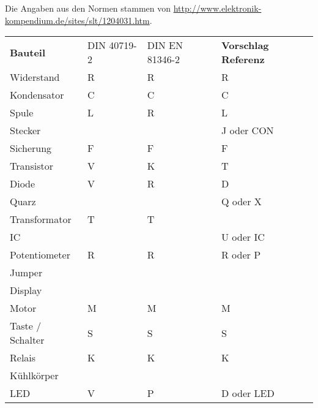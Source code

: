 Die Angaben aus den Normen stammen von 
\url{http://www.elektronik-kompendium.de/sites/slt/1204031.htm}. 
\begin{table}[h!]
  \begin{tabular}{llll}
  \rowcolor{white}  \textbf{Bauteil} 	    & DIN 40719-2   & DIN EN 81346-2    & \textbf{Vorschlag Referenz}\\
  \rowcolor{lgray}  Widerstand            & R             & R                 & R \\
  \rowcolor{white}  Kondensator           & C             & C                 & C \\
  \rowcolor{lgray}  Spule                 & L             & R                 & L \\
  \rowcolor{white}  Stecker               &               &                   & J oder CON \\
  \rowcolor{lgray}  Sicherung             & F             & F                 & F \\
  \rowcolor{white}  Transistor            & V             & K                 & T \\
  \rowcolor{lgray}  Diode                 & V             & R                 & D \\
  \rowcolor{white}  Quarz                 &               &                   & Q oder X \\
  \rowcolor{lgray}  Transformator         & T             & T                 &  \\
  \rowcolor{white}  IC                    &               &                   & U oder IC \\
  \rowcolor{lgray}  Potentiometer         & R             & R                 & R oder P \\
  \rowcolor{white}  Jumper                &               &                   &  \\
  \rowcolor{lgray}  Display               &               &                   &  \\
  \rowcolor{white}  Motor                 & M             & M                 & M \\
  \rowcolor{lgray}  Taste / Schalter      & S             & S                 & S \\
  \rowcolor{white}  Relais                & K             & K                 & K \\
  \rowcolor{lgray}  Kühlkörper            &               &                   &  \\
  \rowcolor{white}  LED                   & V             & P                 & D oder LED \\

\end{tabular}
\end{table}
